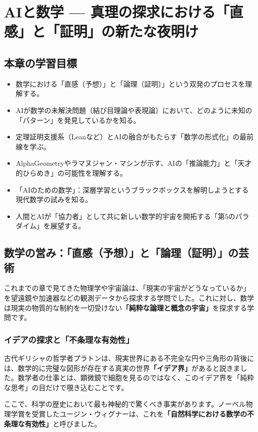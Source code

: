 \chapter{AIと数学 --- 真理の探求における「直感」と「証明」の新たな夜明け}

\section*{本章の学習目標}
\begin{itemize}
\item 数学における「直感（予想）」と「論理（証明）」という双発のプロセスを理解する。
\item AIが数学の未解決問題（結び目理論や表現論）において、どのように未知の「パターン」を発見しているかを知る。
\item 定理証明支援系（Leanなど）とAIの融合がもたらす「数学の形式化」の最前線を学ぶ。
\item AlphaGeometryやラマヌジャン・マシンが示す、AIの「推論能力」と「天才的ひらめき」の可能性を理解する。
\item 「AIのための数学」：深層学習というブラックボックスを解明しようとする現代数学の試みを知る。
\item 人間とAIが「協力者」として共に新しい数学的宇宙を開拓する「第5のパラダイム」を展望する。
\end{itemize}

\section{数学の営み：「直感（予想）」と「論理（証明）」の芸術}

これまでの章で見てきた物理学や宇宙論は、「現実の宇宙がどうなっているか」を望遠鏡や加速器などの観測データから探求する学問でした。これに対し、数学は現実の物質的な制約を一切受けない\textbf{「純粋な論理と概念の宇宙」}を探求する学問です。

\subsection{イデアの探求と「不条理な有効性」}

古代ギリシャの哲学者プラトンは、現実世界にある不完全な円や三角形の背後には、数学的に完璧な図形が存在する真実の世界\textbf{「イデア界」}があると説きました。数学者の仕事とは、顕微鏡で細胞を見るのではなく、このイデア界を「純粋な思考」の目だけで覗き込むことです。

ここで、科学の歴史において最も神秘的で驚くべき事実があります。ノーベル物理学賞を受賞したユージン・ウィグナーは、これを\textbf{「自然科学における数学の不条理な有効性」}と呼びました。

